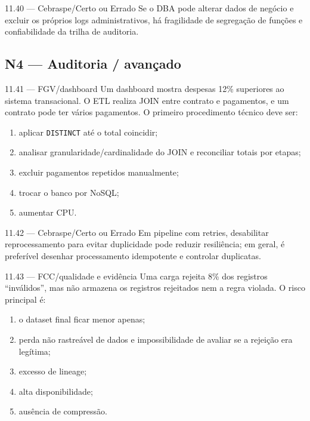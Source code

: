 \begin{questao}{ 11.40 — Cebraspe/Certo ou Errado}
Se o DBA pode alterar dados de negócio e excluir os próprios logs administrativos, há fragilidade de segregação de funções e confiabilidade da trilha de auditoria.
\end{questao}

\subsection*{N4 — Auditoria / avançado}

\begin{questao}{ 11.41 — FGV/dashboard}
Um dashboard mostra despesas 12\% superiores ao sistema transacional. O ETL realiza JOIN entre contrato e pagamentos, e um contrato pode ter vários pagamentos. O primeiro procedimento técnico deve ser:
\begin{enumerate}[label=\Alph*)]
\item aplicar \texttt{DISTINCT} até o total coincidir;
\item analisar granularidade/cardinalidade do JOIN e reconciliar totais por etapas;
\item excluir pagamentos repetidos manualmente;
\item trocar o banco por NoSQL;
\item aumentar CPU.
\end{enumerate}
\end{questao}

\begin{questao}{ 11.42 — Cebraspe/Certo ou Errado}
Em pipeline com retries, desabilitar reprocessamento para evitar duplicidade pode reduzir resiliência; em geral, é preferível desenhar processamento idempotente e controlar duplicatas.
\end{questao}

\begin{questao}{ 11.43 — FCC/qualidade e evidência}
Uma carga rejeita 8\% dos registros ``inválidos'', mas não armazena os registros rejeitados nem a regra violada. O risco principal é:
\begin{enumerate}[label=\Alph*)]
\item o dataset final ficar menor apenas;
\item perda não rastreável de dados e impossibilidade de avaliar se a rejeição era legítima;
\item excesso de lineage;
\item alta disponibilidade;
\item ausência de compressão.
\end{enumerate}
\end{questao}

